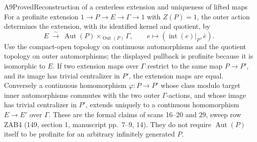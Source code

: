 \begin{result}{A9}{Proved}{Reconstruction of a centerless extension and uniqueness of lifted maps}
\label{res:A9}
For a profinite extension $1\to P\to E\to\Gamma\to1$ with
$Z(P)=1$, the outer action determines the extension, with its
identified kernel and quotient, by
\[
 E\ \xrightarrow{\sim}\
 \operatorname{Aut}(P)\times_{\operatorname{Out}(P)}\Gamma,
 \qquad e\longmapsto(\operatorname{int}(e)|_P,\bar e).
\]
Use the compact-open topology on continuous automorphisms and the
quotient topology on outer automorphisms; the displayed pullback
is profinite because it is isomorphic to $E$.
If two extension maps over $\Gamma$ restrict to the same map
$P\to P'$, and its image has trivial centralizer in $P'$, the
extension maps are equal. Conversely a continuous homomorphism
$\varphi:P\to P'$ whose class modulo target inner automorphisms
commutes with the two outer $\Gamma$-actions, and whose image has
trivial centralizer in $P'$, extends uniquely to a continuous
homomorphism $E\to E'$ over $\Gamma$. These are the formal claims of scans
16--20 and 29, sweep row ZAB4 (149, section 1, manuscript pp.~7--9,
14). They do not require $\operatorname{Aut}(P)$ itself to be
profinite for an arbitrary infinitely generated $P$.
\end{result}
